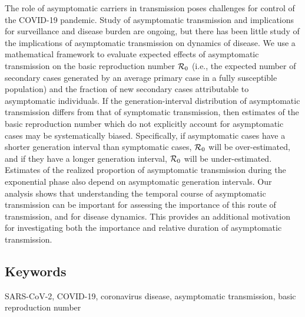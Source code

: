 {\footnotesize 

The role of asymptomatic carriers in transmission poses challenges for control of the COVID-19 pandemic. 
Study of asymptomatic transmission and implications for surveillance and disease burden are ongoing,  
but there has been little study of the implications of asymptomatic transmission on dynamics of disease.
We use a mathematical framework to evaluate expected effects of asymptomatic transmission on the basic reproduction number ${\cal{R}}_0$ (i.e., the expected number of secondary cases generated by an average primary case in a fully susceptible population) and the fraction of new secondary cases attributable to asymptomatic individuals.
If the generation-interval distribution of asymptomatic transmission differs from that of symptomatic transmission, then estimates of the basic reproduction number which do not explicitly account for asymptomatic cases may be systematically biased. 
Specifically, if asymptomatic cases have a shorter generation interval than symptomatic cases, ${\cal{R}}_0$ will be over-estimated, and if they have a longer generation interval, ${\cal{R}}_0$ will be under-estimated.
Estimates of the realized proportion of asymptomatic transmission during the exponential phase also depend on asymptomatic generation intervals.
Our analysis shows that understanding the temporal course of asymptomatic transmission can be important for assessing the importance of this route of transmission, and for disease dynamics. This provides an additional motivation for investigating both the importance and relative duration of asymptomatic transmission. 

\subsection*{Keywords}

SARS-CoV-2, COVID-19, coronavirus disease, asymptomatic transmission, basic reproduction number
}
